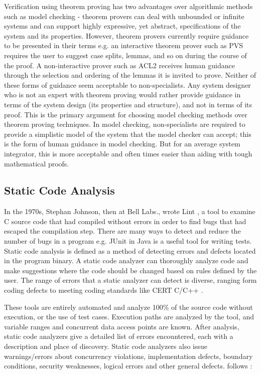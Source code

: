 Verification using theorem proving has two advantages over algorithmic methods
such as model checking - theorem provers can deal with unbounded or infinite
systems and can support highly expressive, yet abstract, specifications of the
system and its properties. However, theorem provers currently require guidance
to be presented in their terms e.g. an interactive theorem prover such as PVS
\cite{owre1992pvs} requires the user to suggest case splits, lemmas, and so on
during the course of the proof. A non-interactive prover such as ACL2
\cite{shelleyacl2} receives human guidance through the selection and ordering of
the lemmas it is invited to prove. Neither of these forms of guidance seem
acceptable to non-specialists. Any system designer who is not an expert with
theorem proving would rather provide guidance in terms of the system design (its
properties and structure), and not in terms of its proof. This is the primary
argument for choosing model checking methods over theorem proving techniques. In
model checking, non-specialists are required to provide a simplistic model of
the system that the model checker can accept; this is the form of human guidance
in model checking. But for an average system integrator, this is more acceptable
and often times easier than aiding with tough mathematical proofs.

\subsection{Static Code Analysis}

In the 1970s, Stephan Johnson, then at Bell Labs., wrote Lint
\cite{johnson1977lint}, a tool to examine C source code that had compiled
without errors in order to find bugs that had escaped the compilation step.
There are many ways to detect and reduce the number of bugs in a program e.g.
JUnit \cite{massol2003junit} in Java is a useful tool for writing tests. Static
code analysis \cite{Static_Code_Analysis} is defined as a method of detecting
errors and defects located in the program binary. A static code analyzer can
thoroughly analyze code and make suggestions where the code should be changed
based on rules defined by the user. The range of errors that a static analyzer
can detect is diverse, ranging form coding defects to meeting coding standards
like CERT C/C++ \cite{seacord2005secure}.

These tools are entirely automated and analyze 100\% of the source code without
execution, or the use of test cases. Execution paths are analyzed by the tool,
and variable ranges and concurrent data access points are known. After analysis,
static code analyzers give a detailed list of errors encountered, each with a
description and place of discovery. Static code analyzers also issue
warnings/errors about concurrency violations, implementation defects, boundary
conditions, security weaknesses, logical errors and other general defects.
follows \cite{german2003software} :

